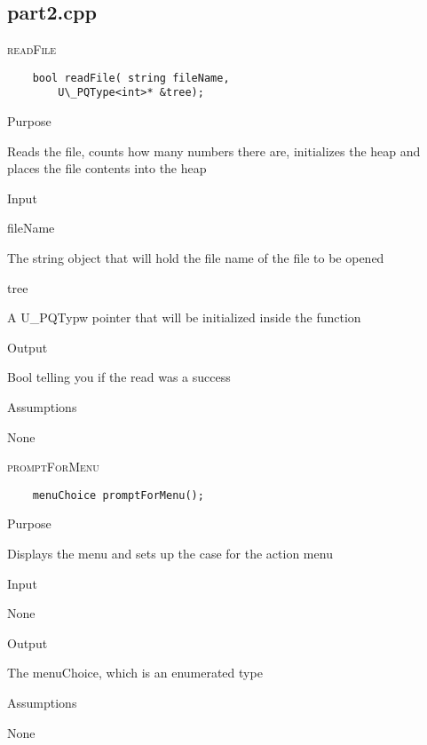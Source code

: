 \documentclass[pdftex, 12pt]{article}
\begin{document}
\subsection{part2.cpp}
\begin{description}
	\item{\textsc{readFile}}
\begin{lstlisting}
	bool readFile( string fileName, 
		U\_PQType<int>* &tree);
\end{lstlisting}
		\begin{description}

			\item{Purpose}

				Reads the file, counts how many numbers there are, initializes the heap and places the file contents
				into the heap

			\item{Input}

				\begin{description}

					\item{fileName}

						The string object that will hold the file name of the file to be opened

					\item{tree}

						A U\_PQTypw pointer that will be initialized inside the function

				\end{description}

			\item{Output}

				Bool telling you if the read was a success

			\item{Assumptions}

				None

		\end{description}
	\item{\textsc{promptForMenu}}
\begin{lstlisting}
	menuChoice promptForMenu();
\end{lstlisting}
		\begin{description}

			\item{Purpose}

				Displays the menu and sets up the case for the action menu

			\item{Input}

				None

			\item{Output}

				The menuChoice, which is an enumerated type

			\item{Assumptions}

				None

		\end{description}

\end{description}
\end{document}
